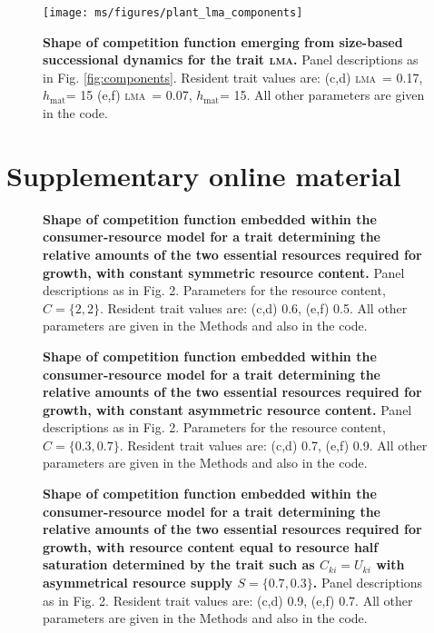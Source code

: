 \documentclass[a4paper,11pt]{article}
\newcommand{\hmat}{\ensuremath{h_{\text{mat}}}}
\newcommand{\lma}{\textsc{lma}}
\begin{document}
\clearpage

\begin{figure}[ht]
 \centering
 \texttt{[image: ms/figures/plant\_lma\_components]}
 \caption{{\bf Shape of competition function emerging from size-based successional dynamics for the trait \lma.} 
 Panel descriptions as in Fig. \ref{fig:components}. Resident trait values are: (c,d) \lma\ = 0.17, \hmat = 15 (e,f) \lma\ = 0.07, \hmat = 15. All other parameters are given in the code.}
 \label{fig:plant_lma}
\end{figure}

\clearpage




\clearpage

\section{Supplementary online material}

\renewcommand{\thefigure}{A\arabic{figure}}
\setcounter{figure}{0}


\begin{figure}[ht]
\caption{{\bf Shape of competition function embedded within the consumer-resource model for a trait determining the relative amounts of the two essential resources required for growth, with constant symmetric resource content.} Panel descriptions as in Fig. 2. Parameters for the resource content, $C = \{2, 2\}$. Resident trait values are: (c,d) 0.6, (e,f) 0.5. All other parameters are given in the Methods and also in the code.}
\end{figure}

\begin{figure}[ht]
 \caption{{\bf Shape of competition function embedded within the consumer-resource model for a trait determining the relative amounts of the two essential resources required for growth, with constant asymmetric resource content.} Panel descriptions as in Fig. 2. Parameters for the resource content, $C = \{0.3, 0.7\}$. Resident trait values are: (c,d) 0.7, (e,f) 0.9. All other parameters are given in the Methods and also in the code.}
\end{figure}

\begin{figure}[ht]
 \caption{{\bf Shape of competition function embedded within the consumer-resource model for a trait determining the relative amounts of the two essential resources required for growth, with resource content equal to resource half saturation determined by the trait such as $C_{ki} = U_{ki}$ with asymmetrical resource supply $S = \{0.7, 0.3\}$.} Panel descriptions as in Fig. 2. Resident trait values are: (c,d) 0.9, (e,f) 0.7. All other parameters are given in the Methods and also in the code.} 
\end{figure}
\end{document}
